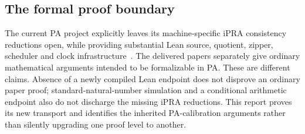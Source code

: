 \subsection{The formal proof boundary}

The current PA project explicitly leaves its machine-specific iPRA
consistency reductions open, while providing substantial Lean source,
quotient, zipper, scheduler and clock infrastructure~\cite{pa-status}.
The delivered papers separately give ordinary mathematical arguments
intended to be formalizable in PA. These are different claims. Absence of
a newly compiled Lean endpoint does not disprove an ordinary paper proof;
standard-natural-number simulation and a conditional arithmetic endpoint
also do not discharge the missing iPRA reductions. This report proves its
new transport and identifies the inherited PA-calibration arguments rather
than silently upgrading one proof level to another.
